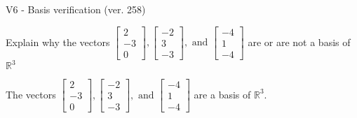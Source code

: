 \begin{exercise}
  \begin{exerciseTitle}V6 - Basis verification (ver. 258)\end{exerciseTitle}
  \begin{exerciseStatement}
    Explain why the vectors \(\left[\begin{array}{r}
2 \\
-3 \\
0
\end{array}\right] , \left[\begin{array}{r}
-2 \\
3 \\
-3
\end{array}\right] , \text{ and } \left[\begin{array}{r}
-4 \\
1 \\
-4
\end{array}\right]\) are or are not a basis of \(\mathbb{R}^3\)	


  \end{exerciseStatement}
  \begin{exerciseAnswer}
   The vectors \(\left[\begin{array}{r}
2 \\
-3 \\
0
\end{array}\right] , \left[\begin{array}{r}
-2 \\
3 \\
-3
\end{array}\right] , \text{ and } \left[\begin{array}{r}
-4 \\
1 \\
-4
\end{array}\right]\) 
  	 are  a basis of \(\mathbb{R}^3\).
  


  \end{exerciseAnswer}
\end{exercise}